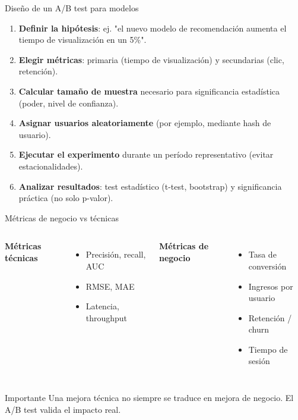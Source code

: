 \documentclass[aspectratio=169, 10pt, xcolor=table]{beamer}
\begin{document}
\begin{frame}{Diseño de un A/B test para modelos}
    \begin{enumerate}
        \item \textbf{Definir la hipótesis}: ej. "el nuevo modelo de recomendación aumenta el tiempo de visualización en un 5\%".
        \item \textbf{Elegir métricas}: primaria (tiempo de visualización) y secundarias (clic, retención).
        \item \textbf{Calcular tamaño de muestra} necesario para significancia estadística (poder, nivel de confianza).
        \item \textbf{Asignar usuarios aleatoriamente} (por ejemplo, mediante hash de usuario).
        \item \textbf{Ejecutar el experimento} durante un período representativo (evitar estacionalidades).
        \item \textbf{Analizar resultados}: test estadístico (t-test, bootstrap) y significancia práctica (no solo p-valor).
    \end{enumerate}
\end{frame}

\begin{frame}{Métricas de negocio vs técnicas}
    \begin{columns}[t]
        \textbf{Métricas técnicas}
        \begin{itemize}
            \item Precisión, recall, AUC
            \item RMSE, MAE
            \item Latencia, throughput
        \end{itemize}
        \textbf{Métricas de negocio}
        \begin{itemize}
            \item Tasa de conversión
            \item Ingresos por usuario
            \item Retención / churn
            \item Tiempo de sesión
        \end{itemize}
    \end{columns}
    \vspace{0.3cm}
    \begin{alertblock}{Importante}
        Una mejora técnica no siempre se traduce en mejora de negocio. El A/B test valida el impacto real.
    \end{alertblock}
\end{frame}
\end{document}
